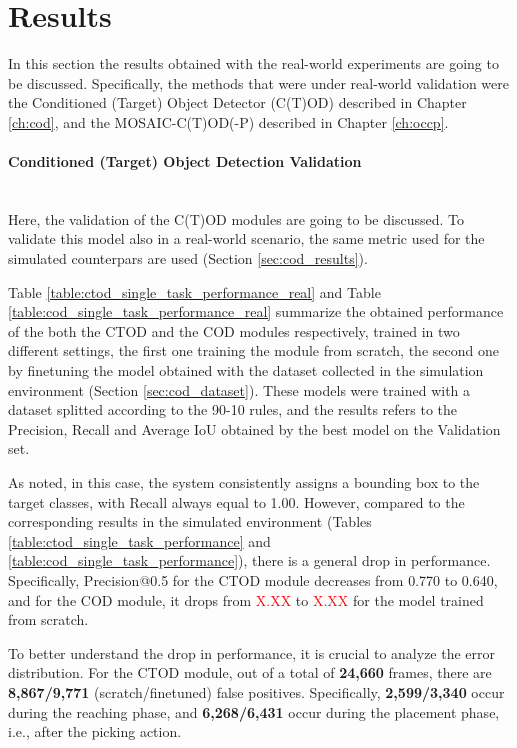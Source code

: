 \section{Results}
\label{sec:real_results}
In this section the results obtained with the real-world experiments are going to be discussed.
Specifically, the methods that were under real-world validation were the Conditioned (Target) Object Detector (C(T)OD) described in Chapter \ref{ch:cod}, and the MOSAIC-C(T)OD(-P) described in Chapter \ref{ch:occp}.

\paragraph*{Conditioned (Target) Object Detection Validation}\mbox{}\\
Here, the validation of the C(T)OD modules are going to be discussed. To validate this model also in a real-world scenario, the same metric used for the simulated counterpars are used (Section \ref{sec:cod_results}). 

Table \ref{table:ctod_single_task_performance_real} and Table \ref{table:cod_single_task_performance_real} summarize the obtained performance of the both the CTOD and the COD modules respectively, trained in two different settings, the first one training the module from scratch, the second one by finetuning the model obtained with the dataset collected in the simulation environment (Section \ref{sec:cod_dataset}). These models were trained with a dataset splitted according to the 90-10 rules, and the results refers to the Precision, Recall and Average IoU obtained by the best model on the Validation set.




As noted, in this case, the system consistently assigns a bounding box to the target classes, with Recall always equal to 1.00. However, compared to the corresponding results in the simulated environment (Tables \ref{table:ctod_single_task_performance} and \ref{table:cod_single_task_performance}), there is a general drop in performance. Specifically, Precision@0.5 for the CTOD module decreases from 0.770 to 0.640, and for the COD module, it drops from \textcolor{red}{X.XX} to \textcolor{red}{X.XX} for the model trained from scratch.

To better understand the drop in performance, it is crucial to analyze the error distribution. For the CTOD module, out of a total of \textbf{24,660} frames, there are \textbf{8,867/9,771} (scratch/finetuned) false positives. Specifically, \textbf{2,599/3,340} occur during the reaching phase, and \textbf{6,268/6,431} occur during the placement phase, i.e., after the picking action. 

